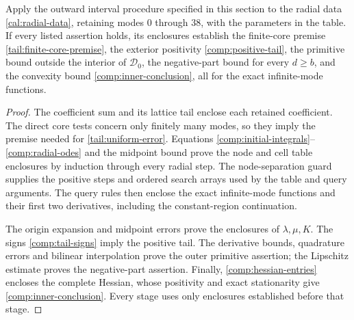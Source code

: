 \begin{proposition}
\label{comp:finite-soundness}
Apply the outward interval procedure specified in this section to
the radial data \eqref{cal:radial-data}, retaining modes $0$ through
$38$, with the parameters in the table.  If every listed assertion
holds, its enclosures establish the finite-core premise
\eqref{tail:finite-core-premise}, the exterior positivity
\eqref{comp:positive-tail}, the primitive bound outside the interior
of $\mathcal D_0$, the negative-part bound for every $d\ge b$, and
the convexity bound \eqref{comp:inner-conclusion}, all for the exact
infinite-mode functions.
\end{proposition}
\begin{proof}
The coefficient sum and its lattice tail enclose each retained
coefficient.  The direct core tests concern only finitely many
modes, so they imply the premise needed for
\eqref{tail:uniform-error}.  Equations
\eqref{comp:initial-integrals}--\eqref{comp:radial-odes} and
the midpoint bound prove the node and cell table enclosures by
induction through every radial step.  The node-separation guard supplies
the positive steps and ordered search arrays used by the table and
query arguments.  The query rules then enclose
the exact infinite-mode functions and their first two derivatives,
including the constant-region continuation.

The origin expansion and midpoint errors prove the enclosures of
$\lambda,\mu,K$.  The signs \eqref{comp:tail-signs} imply the
positive tail.  The derivative bounds, quadrature errors and
bilinear interpolation prove the outer primitive assertion;
the Lipschitz estimate proves the negative-part assertion.
Finally, \eqref{comp:hessian-entries} encloses the complete
Hessian, whose positivity and exact stationarity give
\eqref{comp:inner-conclusion}.  Every stage uses only enclosures
established before that stage.
\end{proof}

